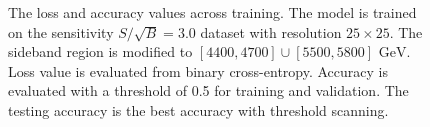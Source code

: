 \documentclass[12pt]{article}
\begin{document}
\begin{figure}[htpb]
{            }
            \caption{The loss and accuracy values across training. The model is trained on the sensitivity $S / \sqrt{B} = 3.0$ dataset with resolution $25\times 25$. The sideband region is modified to $[4400,4700] \cup [5500,5800] \text{ GeV}$. Loss value is evaluated from binary cross-entropy. Accuracy is evaluated with a threshold of 0.5 for training and validation. The testing accuracy is the best accuracy with threshold scanning.}
            \label{fig:loss_acc_across_training_SB_3_res_25_new_SB}
        \end{figure}
\end{document}
